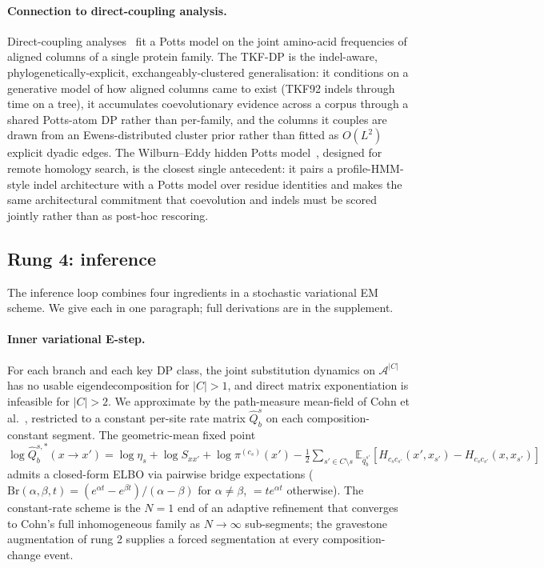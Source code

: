 \documentclass[11pt]{article}
\theoremstyle{definition}
\theoremstyle{remark}
\newcommand{\E}{\mathbb{E}}
\begin{document}
\paragraph{Connection to direct-coupling analysis.}
Direct-coupling analyses~\citep{Marks2011,Morcos2011,ekeberg2013}
fit a Potts model on the joint amino-acid frequencies of aligned
columns of a single protein family. The TKF-DP is the indel-aware,
phylogenetically-explicit, exchangeably-clustered generalisation:
it conditions on a generative model of how aligned columns came to
exist (TKF92 indels through time on a tree), it accumulates
coevolutionary evidence across a corpus through a shared Potts-atom
DP rather than per-family, and the columns it couples are drawn
from an Ewens-distributed cluster prior rather than fitted as
$O(L^2)$ explicit dyadic edges. The Wilburn--Eddy hidden Potts
model~\citep{wilburneddy2020}, designed for remote homology search,
is the closest single antecedent: it pairs a profile-HMM-style
indel architecture with a Potts model over residue identities and
makes the same architectural commitment that coevolution and
indels must be scored jointly rather than as post-hoc rescoring.

\subsection{Rung 4: inference}
\label{sec:rung4}

The inference loop combines four ingredients in a stochastic
variational EM scheme. We give each in one paragraph; full
derivations are in the supplement.

\paragraph{Inner variational E-step.}
For each branch and each key DP class, the joint
substitution dynamics on $\mathcal{A}^{|C|}$ has no usable
eigendecomposition for $|C|>1$, and direct matrix exponentiation is infeasible for $|C|>2$.
We approximate by the path-measure mean-field
of Cohn et al.~\citep{cohn2010}, restricted to a constant per-site
rate matrix $\hat Q^s_b$ on each composition-constant segment.
The geometric-mean fixed point
$\log \hat Q^{s,*}_b(x \to x') = \log\eta_s + \log S_{xx'} + \log \pi^{(c_s)}(x') -
\tfrac12 \sum_{s' \in C \setminus s} \E_{\bar q^{s'}_b}[H_{c_s c_{s'}}(x', x_{s'}) - H_{c_s c_{s'}}(x, x_{s'})]$
admits a closed-form ELBO via pairwise bridge expectations
($\mathrm{Br}(\alpha, \beta, t) = (e^{\alpha t} - e^{\beta t}) /
(\alpha - \beta)$ for $\alpha \ne \beta$, $= t e^{\alpha t}$ otherwise).
The constant-rate scheme is the $N=1$ end of an adaptive refinement
that converges to Cohn's full inhomogeneous family as $N \to \infty$
sub-segments; the gravestone augmentation of rung 2 supplies a
forced segmentation at every composition-change event.
\end{document}
